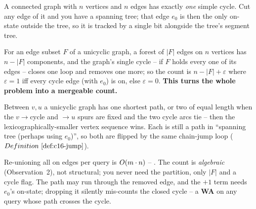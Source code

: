 \begin{observation}
A connected graph with \(n\) vertices and \(n\) edges has exactly \emph{one} simple cycle. Cut any
edge of it and you have a spanning tree; that edge \(e_0\) is then the only on-state outside the
tree, so it is tracked by a single bit alongside the tree's segment tree.
\end{observation}
\begin{observation}
For an edge subset \(F\) of a unicyclic graph, a forest of \(|F|\) edges on \(n\) vertices has
\(n-|F|\) components, and the graph's single cycle -- if \(F\) holds every one of its edges --
closes one loop and removes one more; so the count is \(n-|F|+\varepsilon\) where \(\varepsilon=1\)
iff every cycle edge (with \(e_0\)) is on, else \(\varepsilon=0\). \textbf{This turns the whole
problem into a mergeable count.}
\end{observation}
\begin{observation}
Between \(v,u\) a unicyclic graph has one shortest path, or two of equal length when the
\(v\!\to\!\)cycle and \(\!\to\! u\) spurs are fixed and the two cycle arcs tie -- then the
lexicographically-smaller vertex sequence wins. Each is still a path in ``spanning tree (perhaps
using \(e_0\))'', so both are flipped by the same chain-jump loop (\(\defref{c16-jump}\)).
\end{observation}

\begin{thinkbox}
{Re-unioning all on edges per query is \(O(m\cdot n)\) -- \tle. The count is
\emph{algebraic} (Observation~2), not structural; you never need the partition, only \(|F|\) and a
cycle flag.}
{The path may run through the removed edge, and the \(+1\) term needs \(e_0\)'s on-state; dropping
it silently mis-counts the closed cycle -- a \textbf{WA} on any query whose path crosses the cycle.}
\end{thinkbox}

